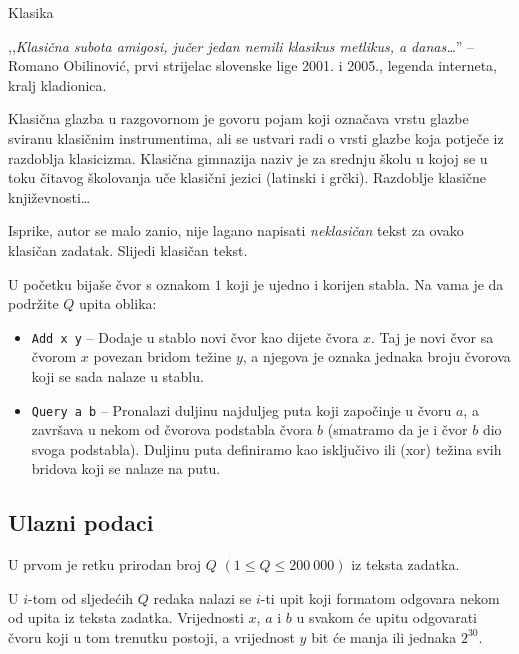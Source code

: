 \begin{statement}[
  problempoints=110,
  timelimit=5 sekundi,
  memorylimit=512 MiB,
]{Klasika}


,,\textit{Klasična subota amigosi, jučer jedan nemili klasikus metlikus, a danas\dots}''
-- Romano Obilinović, prvi strijelac slovenske lige 2001. i 2005.,
legenda interneta, kralj kladionica.

Klasična glazba u razgovornom je govoru pojam koji označava vrstu glazbe
sviranu klasičnim instrumentima, ali se ustvari radi o vrsti glazbe koja
potječe iz razdoblja klasicizma. Klasična gimnazija naziv je za srednju školu
u kojoj se u toku čitavog školovanja uče klasični jezici (latinski i grčki).
Razdoblje klasične književnosti\dots

Isprike, autor se malo zanio, nije lagano napisati \textit{neklasičan} tekst
za ovako klasičan zadatak. Slijedi klasičan tekst.

U početku bijaše čvor s oznakom $1$ koji je ujedno i korijen stabla. Na vama je
da podržite $Q$ upita oblika:
\begin{itemize}
  \item \texttt{Add x y} -- Dodaje u stablo novi čvor kao dijete čvora $x$. Taj
        je novi čvor sa čvorom $x$ povezan bridom težine $y$, a njegova je oznaka
        jednaka broju čvorova koji se sada nalaze u stablu.
  \item \texttt{Query a b} -- Pronalazi duljinu najduljeg puta koji započinje u
    čvoru $a$, a završava u nekom od čvorova podstabla čvora $b$ (smatramo da je i
    čvor $b$ dio svoga podstabla). Duljinu puta definiramo kao isključivo ili
    (xor) težina svih bridova koji se nalaze na putu.
\end{itemize}

\subsection*{Ulazni podaci}
U prvom je retku prirodan broj $Q$ $(1 \le Q \le 200\ 000)$ iz teksta zadatka.

U $i$-tom od sljedećih $Q$ redaka nalazi se $i$-ti upit koji formatom odgovara
nekom od upita iz teksta zadatka. Vrijednosti $x$, $a$ i $b$ u svakom će
upitu odgovarati čvoru koji u tom trenutku postoji, a vrijednost $y$ bit će
manja ili jednaka $2^{30}$.


\end{statement}
